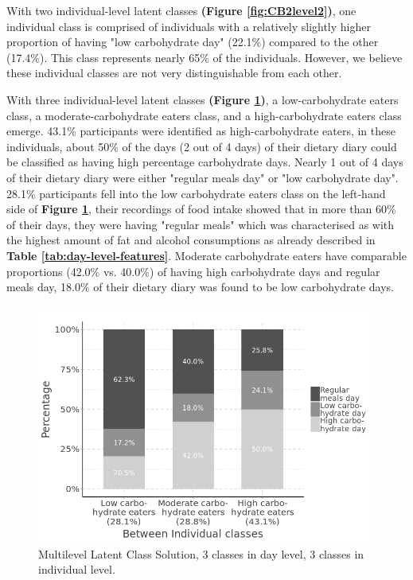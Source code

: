 With two individual-level latent classes \textbf{(Figure \ref{fig:CB2level2})}, one individual class is comprised of individuals with a relatively slightly higher proportion of having "low carbohydrate day" (22.1\%) compared to the other (17.4\%). This class represents nearly 65\% of the individuals. However, we believe these individual classes are not very distinguishable from each other.

With three individual-level latent classes \textbf{(Figure \ref{fig:level2})}, a low-carbohydrate eaters class, a moderate-carbohydrate eaters class, and a high-carbohydrate eaters class emerge. 43.1\% participants were identified as high-carbohydrate eaters, in these individuals, about 50\% of the days (2 out of 4 days) of their dietary diary could be classified as having high percentage carbohydrate days. Nearly 1 out of 4 days of their dietary diary were either "regular meals day" or "low carbohydrate day". 28.1\% participants fell into the low carbohydrate eaters class on the left-hand side of \textbf{Figure \ref{fig:level2}}, their recordings of food intake showed that in more than 60\% of their days, they were having "regular meals" which was characterised as with the highest amount of fat and alcohol consumptions as already described in \textbf{Table \ref{tab:day-level-features}}. Moderate carbohydrate eaters have comparable proportions (42.0\% vs. 40.0\%) of having high carbohydrate days and regular meals day, 18.0\% of their dietary diary was found to be low carbohydrate days.

\begin{figure}
	\centering
	\includegraphics[width=11cm]{Figures/level2.png}
	\decoRule
	\caption[Multilevel Latent Class Solution ($3\times3$).]{Multilevel Latent Class Solution, 3 classes in day level, 3 classes in individual level.}
	\label{fig:level2}
\end{figure}


